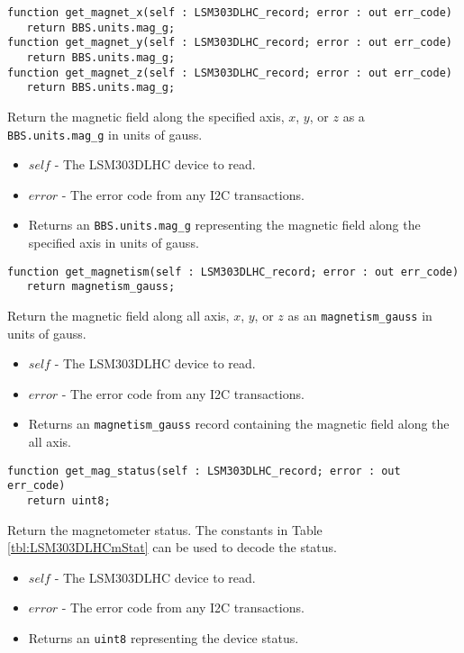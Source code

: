 \documentclass[10pt, openany]{book}
\newcommand{\datatype}[1]{\texttt{#1}}
\begin{document}
\begin{lstlisting}
function get_magnet_x(self : LSM303DLHC_record; error : out err_code)
   return BBS.units.mag_g;
function get_magnet_y(self : LSM303DLHC_record; error : out err_code)
   return BBS.units.mag_g;
function get_magnet_z(self : LSM303DLHC_record; error : out err_code)
   return BBS.units.mag_g;
\end{lstlisting}
Return the magnetic field along the specified axis, $x$, $y$, or $z$ as a \datatype{BBS.units.mag\_g} in units of gauss.
\begin{itemize}
  \item $self$ - The LSM303DLHC device to read.
  \item $error$ - The error code from any I2C transactions.
  \item Returns an \datatype{BBS.units.mag\_g} representing the magnetic field along the specified axis in units of gauss.
\end{itemize}

\begin{lstlisting}
function get_magnetism(self : LSM303DLHC_record; error : out err_code)
   return magnetism_gauss;
\end{lstlisting}
Return the magnetic field along all axis, $x$, $y$, or $z$ as an \datatype{magnetism\_gauss} in units of gauss.
\begin{itemize}
  \item $self$ - The LSM303DLHC device to read.
  \item $error$ - The error code from any I2C transactions.
  \item Returns an \datatype{magnetism\_gauss} record containing the magnetic field along the all axis.
\end{itemize}

\begin{lstlisting}
function get_mag_status(self : LSM303DLHC_record; error : out err_code)
   return uint8;
\end{lstlisting}
Return the magnetometer status.  The constants in Table \ref{tbl:LSM303DLHCmStat} can be used to decode the status.
\begin{itemize}
  \item $self$ - The LSM303DLHC device to read.
  \item $error$ - The error code from any I2C transactions.
  \item Returns an \datatype{uint8} representing the device status.
\end{itemize}
\end{document}
